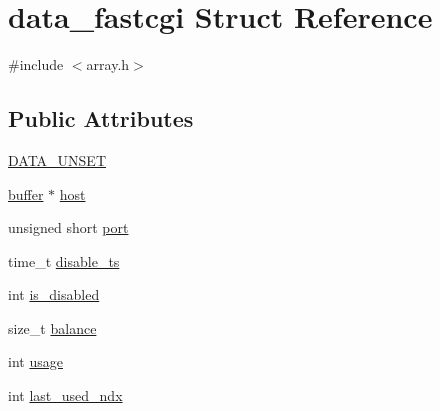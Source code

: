 \hypertarget{structdata__fastcgi}{\section{data\-\_\-fastcgi Struct Reference}
\label{structdata__fastcgi}
}


{\ttfamily \#include $<$array.\-h$>$}

\subsection*{Public Attributes}
\begin{DoxyCompactItemize}
\item 
\hyperlink{structdata__fastcgi_a5d6f1b6fd91e51aaf69a762ae91fc3a9}{D\-A\-T\-A\-\_\-\-U\-N\-S\-E\-T}
\item 
\hyperlink{structbuffer}{buffer} $\ast$ \hyperlink{structdata__fastcgi_a7a9c24ab4f5ac9adad30f456386da83c}{host}
\item 
unsigned short \hyperlink{structdata__fastcgi_acbac078b7f6df440c94faf4ff376cca0}{port}
\item 
time\-\_\-t \hyperlink{structdata__fastcgi_a577cc4369a25513332564a46ba2657c7}{disable\-\_\-ts}
\item 
int \hyperlink{structdata__fastcgi_a8af0f68ddb6b19b086c1de9e1a1deb39}{is\-\_\-disabled}
\item 
size\-\_\-t \hyperlink{structdata__fastcgi_ac4067fab3724bebefa875ef166c87d40}{balance}
\item 
int \hyperlink{structdata__fastcgi_adac3f92f8340f637ac74b5c0067f078c}{usage}
\item 
int \hyperlink{structdata__fastcgi_a6c8fac945c763d170a8fef3a7d0c17d1}{last\-\_\-used\-\_\-ndx}
\end{DoxyCompactItemize}


